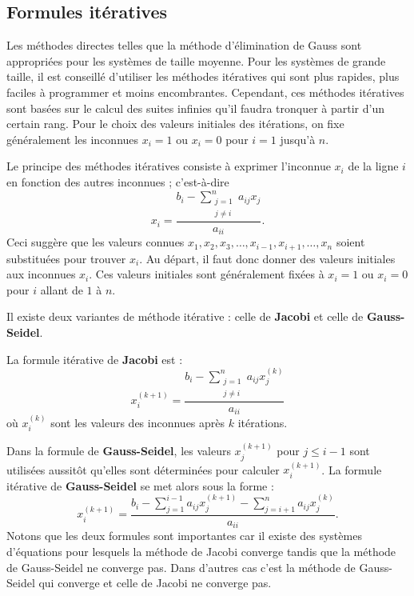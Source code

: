\subsection{Formules itératives}

Les méthodes directes telles que la méthode d'élimination de Gauss sont
appropriées pour les systèmes de taille moyenne. Pour les systèmes de grande
taille, il est conseillé d'utiliser les méthodes itératives qui sont plus
rapides, plus faciles à programmer et moins encombrantes. Cependant, ces
méthodes itératives sont basées sur le calcul des suites infinies qu'il faudra
tronquer à partir d'un certain rang. Pour le choix des valeurs initiales des
itérations, on fixe généralement les inconnues $x_i = 1$ ou $x_i = 0$ pour
$i = 1$ jusqu'à $n$.

Le principe des méthodes itératives consiste à exprimer l'inconnue $x_i$ de la
ligne $i$ en fonction des autres inconnues ; c'est-à-dire
\[
  x_i = \frac{b_i - \displaystyle\sum_{\substack{j=1\\ j\neq i}}^{n} a_{ij}x_j}{a_{ii}} .
\]
Ceci suggère que les valeurs connues $x_1, x_2, x_3, \dots, x_{i-1}, x_{i+1},
\dots, x_n$ soient substituées pour trouver $x_i$. Au départ, il faut donc
donner des valeurs initiales aux inconnues $x_i$. Ces valeurs initiales sont
généralement fixées à $x_i = 1$ ou $x_i = 0$ pour $i$ allant de $1$ à $n$.

Il existe deux variantes de méthode itérative : celle de \textbf{Jacobi} et
celle de \textbf{Gauss-Seidel}.

La formule itérative de \textbf{Jacobi} est :
\[
  x_i^{(k+1)} = \frac{b_i - \displaystyle\sum_{\substack{j=1\\ j\neq i}}^{n} a_{ij}x_j^{(k)}}{a_{ii}}
\]
où $x_i^{(k)}$ sont les valeurs des inconnues après $k$ itérations.

Dans la formule de \textbf{Gauss-Seidel}, les valeurs $x_j^{(k+1)}$ pour
$j \le i-1$ sont utilisées aussitôt qu'elles sont déterminées pour calculer
$x_i^{(k+1)}$. La formule itérative de \textbf{Gauss-Seidel} se met alors sous
la forme :
\[
  x_i^{(k+1)} = \frac{b_i - \displaystyle\sum_{j=1}^{i-1} a_{ij}x_j^{(k+1)}
                 - \displaystyle\sum_{j=i+1}^{n} a_{ij}x_j^{(k)}}{a_{ii}} .
\]
Notons que les deux formules sont importantes car il existe des systèmes
d'équations pour lesquels la méthode de Jacobi converge tandis que la méthode
de Gauss-Seidel ne converge pas. Dans d'autres cas c'est la méthode de
Gauss-Seidel qui converge et celle de Jacobi ne converge pas.

